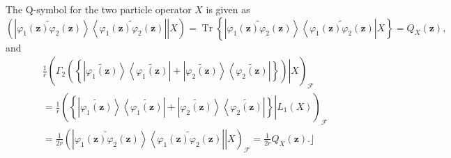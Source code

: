 \documentclass[aps,preprint]{revtex4}%
\begin{document}
The Q-symbol for the two particle operator $X$ is given as
\begin{equation}
\left(  \left.  \left\vert \widetilde{\varphi_{1}\left(  \mathbf{z}\right)
\varphi_{2}\left(  \mathbf{z}\right)  }\right\rangle \left\langle
\widetilde{\varphi_{1}\left(  \mathbf{z}\right)  \varphi_{2}\left(
\mathbf{z}\right)  }\right\vert \right\vert X\right)  =\operatorname*{Tr}%
\left\{  \left\vert \widetilde{\varphi_{1}\left(  \mathbf{z}\right)
\varphi_{2}\left(  \mathbf{z}\right)  }\right\rangle \left\langle
\widetilde{\varphi_{1}\left(  \mathbf{z}\right)  \varphi_{2}\left(
\mathbf{z}\right)  }\right\vert X\right\}  =Q_{X}\left(  \mathbf{z}\right)  ,
\end{equation}
and%
\begin{align}
&  \frac{1}{r}\left(  \left.  \Gamma_{2}\left(  \left\{  \left\vert
\widetilde{\varphi_{1}\left(  \mathbf{z}\right)  }\right\rangle \left\langle
\widetilde{\varphi_{1}\left(  \mathbf{z}\right)  }\right\vert +\left\vert
\widetilde{\varphi_{2}\left(  \mathbf{z}\right)  }\right\rangle \left\langle
\widetilde{\varphi_{2}\left(  \mathbf{z}\right)  }\right\vert \right\}
\right)  \right\vert X\right)  _{\mathcal{F}}\nonumber\\
&  =\frac{1}{r}\left(  \left.  \left\{  \left\vert \widetilde{\varphi
_{1}\left(  \mathbf{z}\right)  }\right\rangle \left\langle \widetilde{\varphi
_{1}\left(  \mathbf{z}\right)  }\right\vert +\left\vert \widetilde{\varphi
_{2}\left(  \mathbf{z}\right)  }\right\rangle \left\langle \widetilde{\varphi
_{2}\left(  \mathbf{z}\right)  }\right\vert \right\}  \right\vert L_{1}\left(
X\right)  \right)  _{\mathcal{F}}\nonumber\\
&  =\frac{1}{2r}\left(  \left.  \left\vert \widetilde{\varphi_{1}\left(
\mathbf{z}\right)  \varphi_{2}\left(  \mathbf{z}\right)  }\right\rangle
\left\langle \widetilde{\varphi_{1}\left(  \mathbf{z}\right)  \varphi
_{2}\left(  \mathbf{z}\right)  }\right\vert \right\vert X\right)
_{\mathcal{F}}=\frac{1}{2r}Q_{X}\left(  \mathbf{z}\right)  .\rfloor
\end{align}
\end{document}
